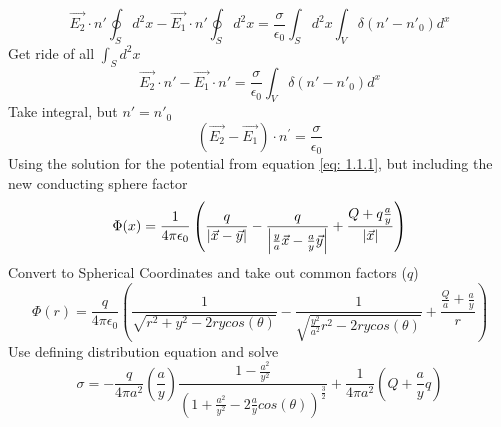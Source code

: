 \documentclass[12pt]{article}
\begin{document}
    \begin{equation} \label{eq: 1.2.7}
        \vec{E_2} \cdot n' \oint_S d^2x - \vec{E_1} \cdot n' \oint_S d^2x = \frac{\sigma}{\epsilon_0} \int_S d^2x \int_V \delta (n'-n'_0) d^x
    \end{equation}
    Get ride of all $\int_S d^2x$
    \begin{equation} \label{eq: 1.2.8}
        \vec{E_2} \cdot n' - \vec{E_1} \cdot n' = \frac{\sigma}{\epsilon_0} \int_V \delta (n'-n'_0) d^x
    \end{equation}
    Take integral, but $n' = n'_0$
    \begin{equation} \label{eq: 1.2.9}        
        (\vec{E_2} - \vec{E_1}) \cdot n^{'} = \frac{\sigma}{\epsilon_0}
    \end{equation}
    Using the solution for the potential from equation \ref{eq: 1.1.1}, but including the new conducting sphere factor
    \begin{equation} \label{10-10-1}
        \Phi(x) = \frac{1}{4 \pi \epsilon_0} \left(\frac{q}{\abs{\vec{x}-\vec{y}}} - \frac{q}{\abs{\frac{y}{a} \vec{x} - \frac{a}{y} \vec{y}}} + \frac{Q + q\frac{a}{y}}{\abs{\vec{x}}} \right)
    \end{equation}
    Convert to Spherical Coordinates and take out common factors ($q$)
    \begin{equation} \label{10-10-2}
        \Phi(r) = \frac{q}{4 \pi \epsilon_0} \left(\frac{1}{\sqrt{r^2 + y^2 - 2 r y cos(\theta)}} - \frac{1}{\sqrt{\frac{y^2}{a^2} r^2 - 2 r y cos(\theta)}} + \frac{\frac{Q}{a} + \frac{a}{y}}{r} \right)
    \end{equation}
    Use defining distribution equation and solve
    \begin{equation} \label{eq: 10-10-3}
        \sigma = -\frac{q}{4 \pi a^2} \left(\frac{a}{y} \right) \frac{1-\frac{a^2}{y^2}}{(1+\frac{a^2}{y^2}-2\frac{a}{y}cos(\theta))^{\frac{3}{2}}} + \frac{1}{4 \pi a^2} \left(Q + \frac{a}{y}q \right)
    \end{equation}
\end{document}
